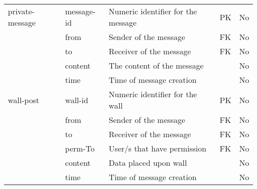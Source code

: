 \begin{tabular}{lllll}
\midrule

private-message & message-id  & Numeric identifier for the message & PK & No  \\
                & from        & Sender of the message              & FK & No  \\
                & to          & Receiver of the message            & FK & No  \\
                & content     & The content of the message         &    & No  \\
                & time        & Time of message creation           &    & No  \\

\midrule

      wall-post & wall-id     & Numeric identifier for the wall    & PK & No  \\
                & from        & Sender of the message              & FK & No  \\
                & to          & Receiver of the message            & FK & No  \\
                & perm-To     & User/s that have permission        & FK & No  \\
                & content     & Data placed upon wall              &    & No  \\
                & time        & Time of message creation           &    & No  \\

\bottomrule

\end{tabular}

